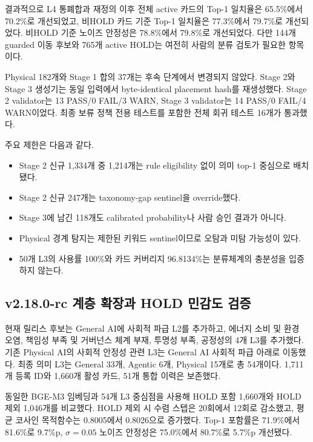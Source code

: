 \documentclass[11pt,a4paper]{article}
\begin{document}
결과적으로 L4 통폐합과 재정의 이후 전체 active 카드의 Top-1 일치율은
65.5\%에서 70.2\%로 개선되었고, 비HOLD 카드 기준 Top-1 일치율은 77.3\%에서
79.7\%로 개선되었다. 비HOLD 기준 노이즈 안정성은 78.8\%에서 79.8\%로
개선되었다. 다만 144개 guarded 이동 후보와 765개 active HOLD는 여전히 사람의
분류 검토가 필요한 항목이다.

Physical 182개와 Stage 1 합의 37개는 후속 단계에서 변경되지 않았다. Stage 2와
Stage 3 생성기는 동일 입력에서 byte-identical placement hash를 재생성했다.
Stage 2 validator는 13 PASS/0 FAIL/3 WARN, Stage 3 validator는
14 PASS/0 FAIL/4 WARN이었다. 최종 보류 정책 전용 테스트를 포함한 전체 회귀
테스트 16개가 통과했다.

주요 제한은 다음과 같다.
\begin{itemize}[leftmargin=2em]
  \item Stage 2 신규 1,334개 중 1,214개는 rule eligibility 없이 의미 top-1 중심으로 배치됐다.
  \item Stage 2 신규 247개는 taxonomy-gap sentinel을 override했다.
  \item Stage 3에 남긴 118개도 calibrated probability나 사람 승인 결과가 아니다.
  \item Physical 경계 탐지는 제한된 키워드 sentinel이므로 오탐과 미탐 가능성이 있다.
  \item 50개 L3의 사용률 100\%와 카드 커버리지 96.8134\%는 분류체계의 충분성을 입증하지 않는다.
\end{itemize}

\subsection{v2.18.0-rc 계층 확장과 HOLD 민감도 검증}

현재 릴리스 후보는 General AI에 사회적 파급 L2를 추가하고, 에너지 소비 및
환경 오염, 책임성 부족 및 거버넌스 체계 부재, 투명성 부족, 공정성의 4개 L3를
추가했다. 기존 Physical AI의 사회적 안정성 관련 L3는 General AI 사회적 파급
아래로 이동했다. 최종 의미 L3는 General 33개, Agentic 6개, Physical 15개로
총 54개이다. 1,711개 등록 ID와 1,660개 활성 카드, 51개 통합 이력은 보존했다.

동일한 BGE-M3 임베딩과 54개 L3 중심점을 사용해 HOLD 포함 1,660개와 HOLD 제외
1,046개를 비교했다. HOLD 제외 시 수렴 스텝은 20회에서 12회로 감소했고,
평균 코사인 목적함수는 0.8005에서 0.8026으로 증가했다. Top-1 포함률은
71.9\%에서 81.6\%로 9.7\%p, $\sigma=0.05$ 노이즈 안정성은 75.0\%에서
80.7\%로 5.7\%p 개선됐다.
\end{document}
